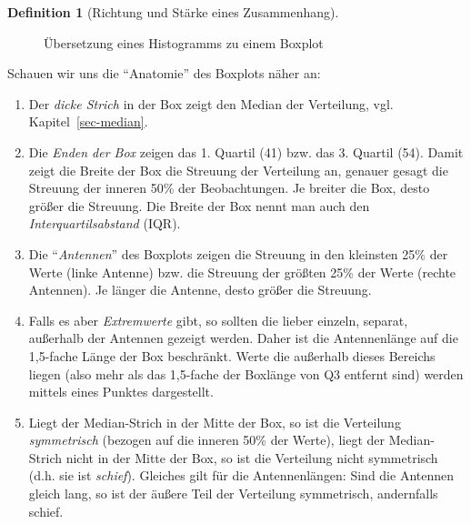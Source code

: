 \documentclass[
  a4paper,
  DIV=11]{scrreprt}
\providecommand{\tightlist}{%
  \setlength{\itemsep}{0pt}\setlength{\parskip}{0pt}}\usepackage{longtable,booktabs,array}
\theoremstyle{definition}
\theoremstyle{definition}
\theoremstyle{definition}
\newtheorem{definition}{Definition}[chapter]
\theoremstyle{remark}
\begin{document}
\begin{definition}[Richtung und Stärke eines
Zusammenhang]
\begin{figure}


\caption{\label{fig-hist-to-box}Übersetzung eines Histogramms zu einem
Boxplot}

\end{figure}%

Schauen wir uns die ``Anatomie'' des Boxplots näher an:

\begin{enumerate}
\def\labelenumi{\arabic{enumi}.}
\tightlist
\item
  Der \emph{dicke Strich} in der Box zeigt den Median der Verteilung,
  vgl. Kapitel~\ref{sec-median}.
\item
  Die \emph{Enden der Box} zeigen das 1. Quartil (41) bzw. das 3.
  Quartil (54). Damit zeigt die Breite der Box die Streuung der
  Verteilung an, genauer gesagt die Streuung der inneren 50\% der
  Beobachtungen. Je breiter die Box, desto größer die Streuung. Die
  Breite der Box nennt man auch den \emph{Interquartilsabstand} (IQR).
\item
  Die ``\emph{Antennen}'' des Boxplots zeigen die Streuung in den
  kleinsten 25\% der Werte (linke Antenne) bzw. die Streuung der größten
  25\% der Werte (rechte Antennen). Je länger die Antenne, desto größer
  die Streuung.
\item
  Falls es aber \emph{Extremwerte} gibt, so sollten die lieber einzeln,
  separat, außerhalb der Antennen gezeigt werden. Daher ist die
  Antennenlänge auf die 1,5-fache Länge der Box beschränkt. Werte die
  außerhalb dieses Bereichs liegen (also mehr als das 1,5-fache der
  Boxlänge von Q3 entfernt sind) werden mittels eines Punktes
  dargestellt.
\item
  Liegt der Median-Strich in der Mitte der Box, so ist die Verteilung
  \emph{symmetrisch} (bezogen auf die inneren 50\% der Werte), liegt der
  Median-Strich nicht in der Mitte der Box, so ist die Verteilung nicht
  symmetrisch (d.h. sie ist \emph{schief}). Gleiches gilt für die
  Antennenlängen: Sind die Antennen gleich lang, so ist der äußere Teil
  der Verteilung symmetrisch, andernfalls schief.
\end{enumerate}


\end{definition}
\end{document}
